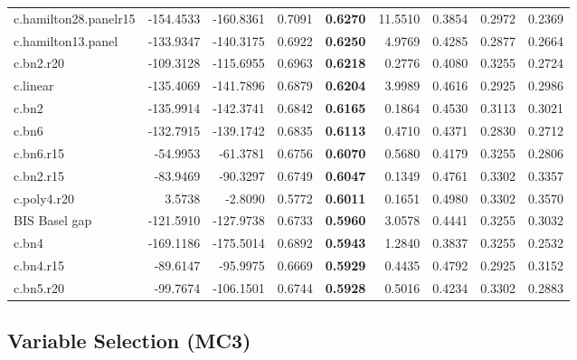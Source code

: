 \documentclass[
  12pt,
]{article}
\begin{document}
\begin{table}[H]
{\begin{tabular}[t]{lrrr>{}rrrrr}
c.hamilton28.panelr15 & -154.4533 & -160.8361 & 0.7091 & \textbf{0.6270} & 11.5510 & 0.3854 & 0.2972 & 0.2369\\
c.hamilton13.panel & -133.9347 & -140.3175 & 0.6922 & \textbf{0.6250} & 4.9769 & 0.4285 & 0.2877 & 0.2664\\
\addlinespace
c.bn2.r20 & -109.3128 & -115.6955 & 0.6963 & \textbf{0.6218} & 0.2776 & 0.4080 & 0.3255 & 0.2724\\
c.linear & -135.4069 & -141.7896 & 0.6879 & \textbf{0.6204} & 3.9989 & 0.4616 & 0.2925 & 0.2986\\
c.bn2 & -135.9914 & -142.3741 & 0.6842 & \textbf{0.6165} & 0.1864 & 0.4530 & 0.3113 & 0.3021\\
c.bn6 & -132.7915 & -139.1742 & 0.6835 & \textbf{0.6113} & 0.4710 & 0.4371 & 0.2830 & 0.2712\\
c.bn6.r15 & -54.9953 & -61.3781 & 0.6756 & \textbf{0.6070} & 0.5680 & 0.4179 & 0.3255 & 0.2806\\
\addlinespace
c.bn2.r15 & -83.9469 & -90.3297 & 0.6749 & \textbf{0.6047} & 0.1349 & 0.4761 & 0.3302 & 0.3357\\
c.poly4.r20 & 3.5738 & -2.8090 & 0.5772 & \textbf{0.6011} & 0.1651 & 0.4980 & 0.3302 & 0.3570\\
BIS Basel gap & -121.5910 & -127.9738 & 0.6733 & \textbf{0.5960} & 3.0578 & 0.4441 & 0.3255 & 0.3032\\
c.bn4 & -169.1186 & -175.5014 & 0.6892 & \textbf{0.5943} & 1.2840 & 0.3837 & 0.3255 & 0.2532\\
c.bn4.r15 & -89.6147 & -95.9975 & 0.6669 & \textbf{0.5929} & 0.4435 & 0.4792 & 0.2925 & 0.3152\\
\addlinespace
c.bn5.r20 & -99.7674 & -106.1501 & 0.6744 & \textbf{0.5928} & 0.5016 & 0.4234 & 0.3302 & 0.2883\\
\bottomrule
\end{tabular}}
\end{table}

\hypertarget{variable-selection-mc3}{%
\subsection{Variable Selection (MC3)}\label{variable-selection-mc3}}
\end{document}
